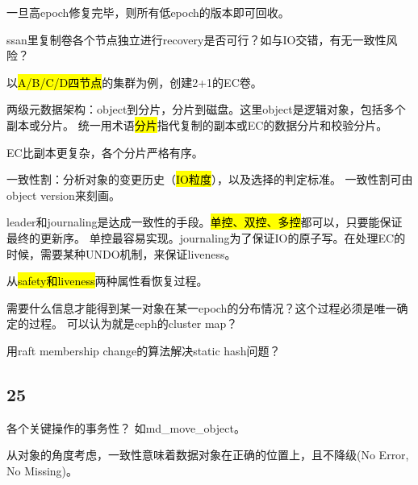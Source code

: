 一旦高epoch修复完毕，则所有低epoch的版本即可回收。

ssan里复制卷各个节点独立进行recovery是否可行？如与IO交错，有无一致性风险？

以\hl{A/B/C/D四节点}的集群为例，创建2+1的EC卷。

\hrulefill

两级元数据架构：object到分片，分片到磁盘。这里object是逻辑对象，包括多个副本或分片。
统一用术语\hl{分片}指代复制的副本或EC的数据分片和校验分片。

EC比副本更复杂，各个分片严格有序。

\hrulefill

一致性割：分析对象的变更历史（\hl{IO粒度}），以及选择的判定标准。
一致性割可由object version来刻画。

leader和journaling是达成一致性的手段。\hl{单控、双控、多控}都可以，只要能保证最终的更新序。
单控最容易实现。journaling为了保证IO的原子写。在处理EC的时候，需要某种UNDO机制，来保证liveness。

从\hl{safety和liveness}两种属性看恢复过程。

需要什么信息才能得到某一对象在某一epoch的分布情况？这个过程必须是唯一确定的过程。
可以认为就是ceph的cluster map？

用raft membership change的算法解决static hash问题？

\subsection{25}

各个关键操作的事务性？ 如md\_move\_object。

从对象的角度考虑，一致性意味着数据对象在正确的位置上，且不降级(No Error, No Missing)。
